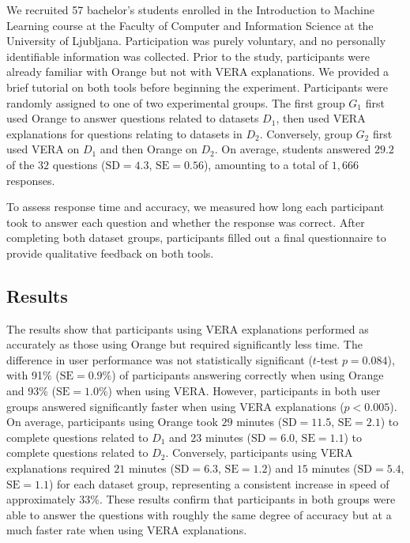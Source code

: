 \documentclass[lettersize,journal]{IEEEtran}
\begin{document}
We recruited 57 bachelor's students enrolled in the Introduction to Machine Learning course at the Faculty of Computer and Information Science at the University of Ljubljana.
Participation was purely voluntary, and no personally identifiable information was collected.
Prior to the study, participants were already familiar with Orange but not with VERA explanations. We provided a brief tutorial on both tools before beginning the experiment.
Participants were randomly assigned to one of two experimental groups. The first group $G_1$ first used Orange to answer questions related to datasets $D_1$, then used VERA explanations for questions relating to datasets in $D_2$. Conversely, group $G_2$ first used VERA on $D_1$ and then Orange on $D_2$. On average, students answered $29.2$ of the $32$ questions ($\text{SD}= 4.3$, $\text{SE}=0.56$), amounting to a total of $1,666$ responses.

To assess response time and accuracy, we measured how long each participant took to answer each question and whether the response was correct. After completing both dataset groups, participants filled out a final questionnaire to provide qualitative feedback on both tools.

\subsection{Results}

The results show that participants using VERA explanations performed as accurately as those using Orange but required significantly less time.
The difference in user performance was not statistically significant ($t$-test $p=0.084$), with 91\% ($\text{SE}=0.9\%$) of participants answering correctly when using Orange and 93\% ($\text{SE}=1.0\%$) when using VERA.
However, participants in both user groups answered significantly faster when using VERA explanations ($p<0.005$). On average, participants using Orange took $29$ minutes ($\text{SD}= 11.5$, $\text{SE}=2.1$) to complete questions related to $D_1$ and $23$ minutes ($\text{SD}= 6.0$, $\text{SE}=1.1$) to complete questions related to $D_2$. Conversely, participants using VERA explanations required $21$ minutes ($\text{SD}= 6.3$, $\text{SE}=1.2$) and $15$ minutes ($\text{SD}=5.4$, $\text{SE}=1.1$) for each dataset group, representing a consistent increase in speed of approximately 33\%.
These results confirm that participants in both groups were able to answer the questions with roughly the same degree of accuracy but at a much faster rate when using VERA explanations.
\end{document}
